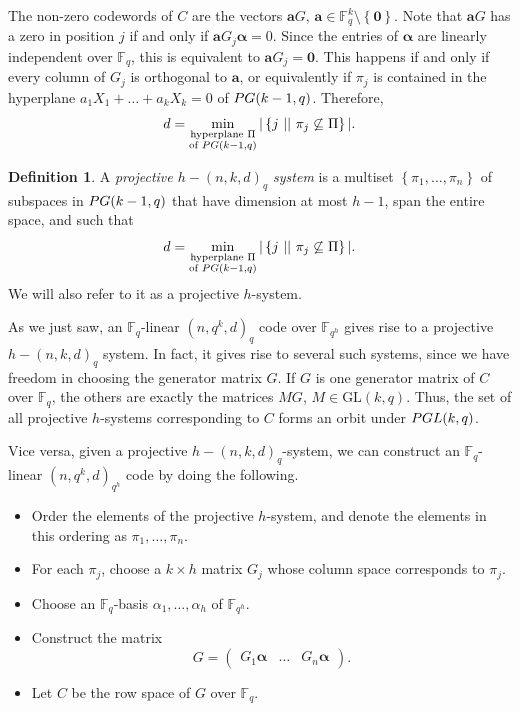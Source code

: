 \documentclass[a4paper]{article}
\theoremstyle{definition}
\newtheorem{df}[thm]{Definition}
\newcommand{\FF}{\mathbb F}
\newcommand{\set}[1]{ \left \{ #1 \right \} }
\newcommand{\sett}[2]{ \left\{ #1 \, \, || \, \, #2 \right \} }
\newcommand{\pg}{\textnormal{PG}}
\newcommand{\zero}{\mathbf 0}
\newcommand{\pgl}{\textnormal{PGL}}
\begin{document}
The non-zero codewords of $C$ are the vectors $\mathbf a G$, $\mathbf a \in \FF_q^{k} \setminus \set \zero$.
Note that $\mathbf a G$ has a zero in position $j$ if and only if $\mathbf a G_j \boldsymbol \alpha = 0$.
Since the entries of $\boldsymbol \alpha$ are linearly independent over $\FF_q$, this is equivalent to $\mathbf a G_j = \zero$.
This happens if and only if every column of $G_j$ is orthogonal to $\mathbf a$, or equivalently if $\pi_j$ is contained in the hyperplane $a_1 X_1 + \dots + a_k X_k = 0$ of $\pg(k-1,q)$.
Therefore,
\[
 d = \min_{\substack{\text{hyperplane } \Pi \\ \text{of } \pg(k-1,q)}} |\sett{j}{\pi_j \not \subseteq \Pi}|.
\]

\begin{df}
A \emph{projective $h-(n,k,d)_q$ system} is a multiset 
\(
 \set{\pi_1, \dots, \pi_n}
\)
of subspaces in $\pg(k-1,q)$ that have dimension at most $h-1$, span the entire space, and such that
\[
 d = \min_{\substack{\text{hyperplane } \Pi \\ \text{of } \pg(k-1,q)}} |\sett{j}{\pi_j \not \subseteq \Pi}|.
\]
We will also refer to it as a projective $h$-system.
\end{df}

As we just saw, an $\FF_q$-linear $(n,q^k,d)_q$ code over $\FF_{q^h}$ gives rise to a projective $h-(n,k,d)_q$ system.
In fact, it gives rise to several such systems, since we have freedom in choosing the generator matrix $G$.
If $G$ is one generator matrix of $C$ over $\FF_q$, the others are exactly the matrices $M G$, $M \in \text{GL}(k,q)$.
Thus, the set of all projective $h$-systems corresponding to $C$ forms an orbit under $\pgl(k,q)$.

\bigskip

Vice versa, given a projective $h-(n,k,d)_q$-system, we can construct an $\FF_q$-linear $(n,q^k,d)_{q^h}$ code by doing the following.
\begin{itemize} 
 \item Order the elements of the projective $h$-system, and denote the elements in this ordering as $\pi_1, \dots, \pi_n$.
 \item For each $\pi_j$, choose a $k \times h$ matrix $G_j$ whose column space corresponds to $\pi_j$.
 \item Choose an $\FF_q$-basis $\alpha_1, \dots, \alpha_h$ of $\FF_{q^h}$.
 \item Construct the matrix
 \[
  G = \begin{pmatrix}
   G_1 \boldsymbol \alpha & \dots & G_n \boldsymbol \alpha
  \end{pmatrix}.
 \]
 \item Let $C$ be the row space of $G$ over $\FF_q$.
\end{itemize}
\end{document}
